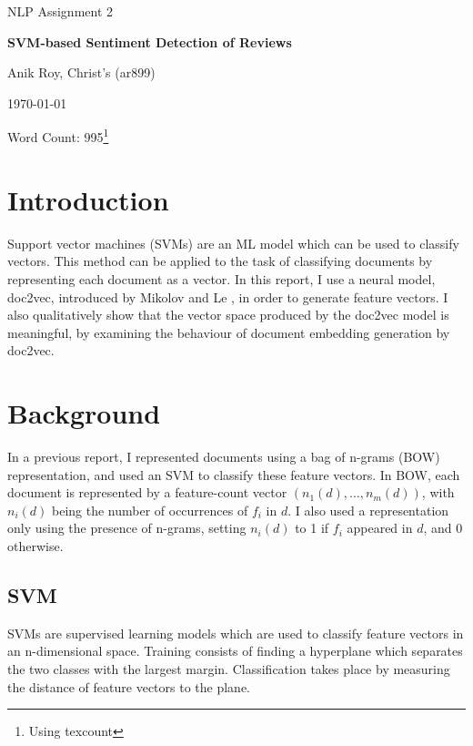 \documentclass[a4paper]{article}
\begin{document}
\centerline{\large NLP Assignment 2}
\vspace{0.2in}
\centerline{\Large\bf SVM-based Sentiment Detection of Reviews}
\vspace{0.1in}
\centerline{\large {Anik Roy, Christ's (ar899)}}
\vspace{0.1in}
\centerline{\large {\today}}
\vspace{0.05in}
\centerline{Word Count: 995\footnote{Using texcount}}
\vspace{0.2in}


\begin{multicols}{2}
  
\section{Introduction}

Support vector machines (SVMs) are an ML model which can be used to classify vectors. This method can be applied to the task of classifying documents by representing each document as a vector. In this report, I use a neural model, doc2vec, introduced by Mikolov and Le \cite{DBLP:journals/corr/LeM14}, in order to generate feature vectors. I also qualitatively show that the vector space produced by the doc2vec model is meaningful, by examining the behaviour of document embedding generation by doc2vec.

\section{Background}

In a previous report, I represented documents using a bag of n-grams (BOW) representation, and used an SVM to classify these feature vectors. In BOW, each document is represented by a feature-count vector $(n_1(d), \dots ,n_m(d))$, with $n_i(d)$ being the number of occurrences of $f_i$ in $d$. I also used a representation only using the presence of n-grams, setting $n_i(d)$ to 1 if $f_i$ appeared in $d$, and 0 otherwise.

\subsection{SVM}

SVMs are supervised learning models which are used to classify feature vectors in an n-dimensional space. Training consists of finding a hyperplane which separates the two classes with the largest margin. Classification takes place by measuring the distance of feature vectors to the plane. 


\end{multicols}
\end{document}
